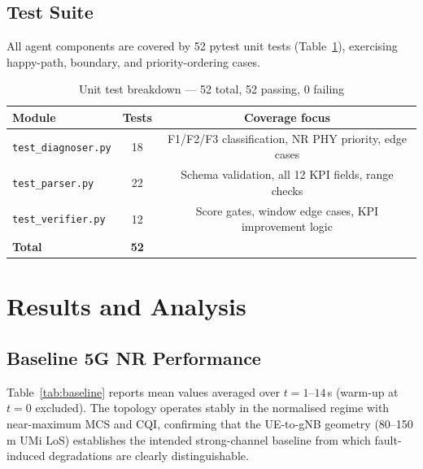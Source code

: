 \documentclass[12pt,a4paper]{article}
\begin{document}
\subsection{Test Suite}

All agent components are covered by 52 pytest unit tests
(Table~\ref{tab:tests}), exercising happy-path, boundary, and priority-ordering
cases.

\begin{table}[H]
\centering
\caption{Unit test breakdown — 52 total, 52 passing, 0 failing}
\label{tab:tests}
\begin{tabular}{lcc}
\toprule
\textbf{Module} & \textbf{Tests} & \textbf{Coverage focus} \\
\midrule
\texttt{test\_diagnoser.py} & 18 & F1/F2/F3 classification, NR PHY priority, edge cases \\
\texttt{test\_parser.py}    & 22 & Schema validation, all 12 KPI fields, range checks \\
\texttt{test\_verifier.py}  & 12 & Score gates, window edge cases, KPI improvement logic \\
\midrule
\textbf{Total}              & \textbf{52} & \\
\bottomrule
\end{tabular}
\end{table}

\section{Results and Analysis}

\subsection{Baseline 5G NR Performance}

Table~\ref{tab:baseline} reports mean values averaged over $t = 1$--$14$\,s
(warm-up at $t=0$ excluded). The topology operates stably in the normalised
regime with near-maximum MCS and CQI, confirming that the UE-to-gNB geometry
(80--150\,m UMi LoS) establishes the intended strong-channel baseline from
which fault-induced degradations are clearly distinguishable.
\end{document}
